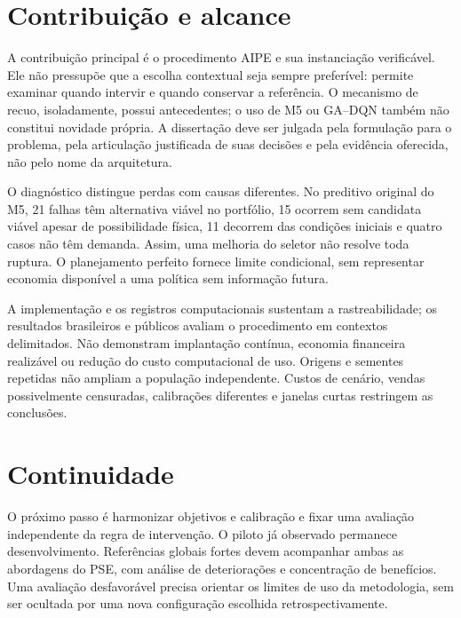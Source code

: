 \section{Contribuição e alcance}
A contribuição principal é o procedimento AIPE e sua instanciação verificável. Ele não pressupõe que a escolha contextual seja sempre preferível: permite examinar quando intervir e quando conservar a referência. O mecanismo de recuo, isoladamente, possui antecedentes; o uso de M5 ou GA--DQN também não constitui novidade própria. A dissertação deve ser julgada pela formulação para o problema, pela articulação justificada de suas decisões e pela evidência oferecida, não pelo nome da arquitetura.

O diagnóstico distingue perdas com causas diferentes. No preditivo original do M5, 21 falhas têm alternativa viável no portfólio, 15 ocorrem sem candidata viável apesar de possibilidade física, 11 decorrem das condições iniciais e quatro casos não têm demanda. Assim, uma melhoria do seletor não resolve toda ruptura. O planejamento perfeito fornece limite condicional, sem representar economia disponível a uma política sem informação futura.

A implementação e os registros computacionais sustentam a rastreabilidade; os resultados brasileiros e públicos avaliam o procedimento em contextos delimitados. Não demonstram implantação contínua, economia financeira realizável ou redução do custo computacional de uso. Origens e sementes repetidas não ampliam a população independente. Custos de cenário, vendas possivelmente censuradas, calibrações diferentes e janelas curtas restringem as conclusões.

\section{Continuidade}
O próximo passo é harmonizar objetivos e calibração e fixar uma avaliação independente da regra de intervenção. O piloto já observado permanece desenvolvimento. Referências globais fortes devem acompanhar ambas as abordagens do PSE, com análise de deteriorações e concentração de benefícios. Uma avaliação desfavorável precisa orientar os limites de uso da metodologia, sem ser ocultada por uma nova configuração escolhida retrospectivamente.
